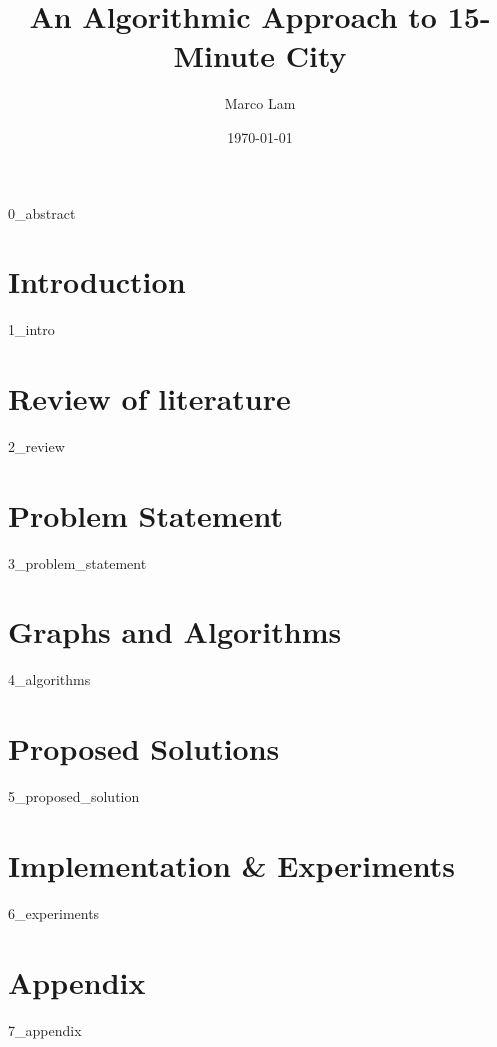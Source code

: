 \documentclass[oneside]{book}
\title{An Algorithmic Approach to 15-Minute City}
\author{Marco Lam}
\date{\today}
\begin{document}
\maketitle

{0_abstract}

\newpage

\tableofcontents
\listoftables
\listofalgorithms
\newpage

\chapter{Introduction}

{1_intro}

\newpage

\chapter{Review of literature} \label{review}

{2_review}

\newpage

\chapter{Problem Statement} \label{problem_statement}

{3_problem_statement}

\newpage

\chapter{Graphs and Algorithms} \label{algorithms}

{4_algorithms}

\newpage

\chapter{Proposed Solutions} \label{proposed_solution}

{5_proposed_solution}

\newpage

\chapter{Implementation \& Experiments} \label{experiments}

{6_experiments}

\newpage

\chapter{Appendix} \label{appendix}

{7_appendix}

\newpage


\end{document}
